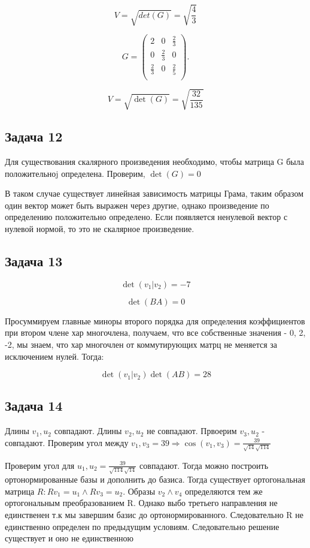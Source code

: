 \documentclass[a4paper,12pt]{article}
\begin{document}
\[
V = \sqrt{det(G)} = \sqrt{\frac{4}{3}}
\]

\[
G = \begin{pmatrix}
2 & 0 & \frac{2}{3} \\
0 & \frac{2}{3} & 0 \\
\frac{2}{3} & 0 & \frac{2}{5} \\
\end{pmatrix}.
\]


\[
V = \sqrt{\det(G)} = \sqrt{\frac{32}{135}}
\]

\subsection{Задача 12}
Для существования скалярного произведения необходимо, чтобы матрица G была положительноj определена. Проверим, $\det(G) = 0$

В таком случае существует линейная зависимость матрицы Грама, таким образом один вектор может быть выражен через другие, однако произведение по определению положительно определено. Если появляется ненулевой вектор с нулевой нормой, то это не скалярное произведение.


\subsection{Задача 13}

\[
\det(v_1|v_2) = -7
\]

\[
\det(BA) = 0
\]

Просуммируем главные миноры второго порядка для определения коэффициентов при втором члене хар многочлена, получаем, что все собственные значения - 0, 2, -2, мы знаем, что хар многочлен от коммутирующих матрц не меняется за исключением нулей. Тогда:

\[
\det(v_1|v_2) \det(AB) = 28
\]

\subsection{Задача 14}

Длины $v_1, u_2$ совпадают. Длины $v_2, u_2$ не совпадают. Првоерим $v_3, u_2$ - совпадают. Проверим угол между $v_1, v_3 = 39 \Rightarrow \cos(v_1, v_3)=\frac{39}{\sqrt{14}\sqrt{114}}$

Проверим угол для $u_1, u_2=\frac{39}{\sqrt{114}\sqrt{14}}$ совпадают. Тогда можно построить ортонормированные базы и дополнить до базиса. Тогда существует ортогональная матрица $R: Rv_1 = u_1 \land Rv_3 = u_2$. Образы $v_2 \land v_4$ определяются тем же ортогональным преобразованием R. Однако выбо третьего направления не единственен т.к мы завершим базис до ортонормированного. Следовательно R не единственно определен по предыдущим условиям. Следовательно решение существует и оно не единственною
\end{document}
